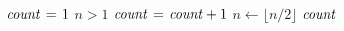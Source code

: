 \begin{codebox}
\li $\id{count} \gets 1$
\li \While $n > 1$
\li \Do
      $\id{count} \gets \id{count}+1$
\li   $n \gets \lfloor n/2 \rfloor$
    \End    
\li \Return $\id{count}$
\end{codebox}
